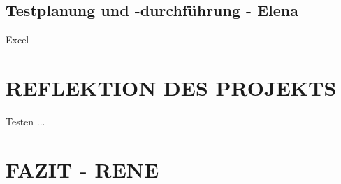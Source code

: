 \documentclass[sigconf]{acmart}
\begin{document}
\subsection{Testplanung und -durchführung - Elena}
Excel

\section{REFLEKTION DES PROJEKTS}
Testen ... 
\section{FAZIT - RENE }





\end{document}

